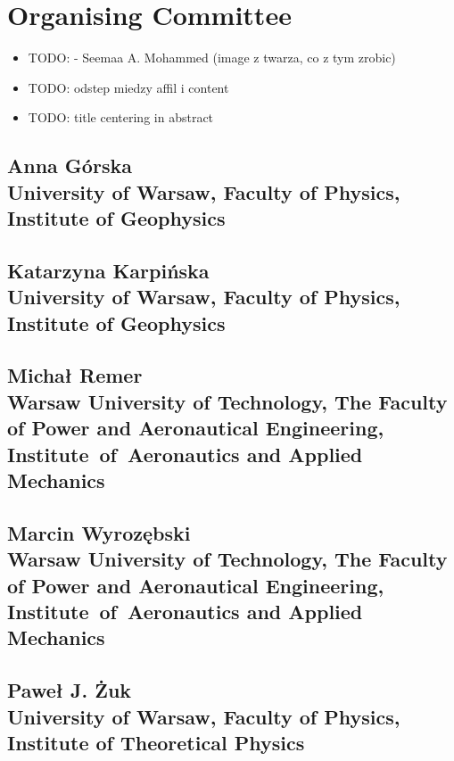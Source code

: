 \section*{Organising Committee}

\begin{itemize}
	\item TODO: - Seemaa A. Mohammed (image z twarza, co z tym zrobic) 
	\item TODO: odstep miedzy affil i content
	\item TODO: title centering in abstract
\end{itemize}

\vspace{.5cm}

\subsection*{Anna Górska \\
\normalfont University of Warsaw, Faculty of Physics, Institute of Geophysics }

\subsection*{Katarzyna Karpińska \\ 
\normalfont University of Warsaw, Faculty of Physics, Institute of Geophysics }

\subsection*{Michał Remer \\
\normalfont Warsaw University of Technology, The Faculty of Power and Aeronautical Engineering, Institute~of~Aeronautics and Applied Mechanics }

\subsection*{Marcin Wyrozębski \\
\normalfont Warsaw University of Technology, The Faculty of Power and Aeronautical Engineering, Institute~of~Aeronautics and Applied Mechanics}

\subsection*{Paweł J. Żuk \\
\normalfont University of Warsaw, Faculty of Physics, Institute of Theoretical Physics }
